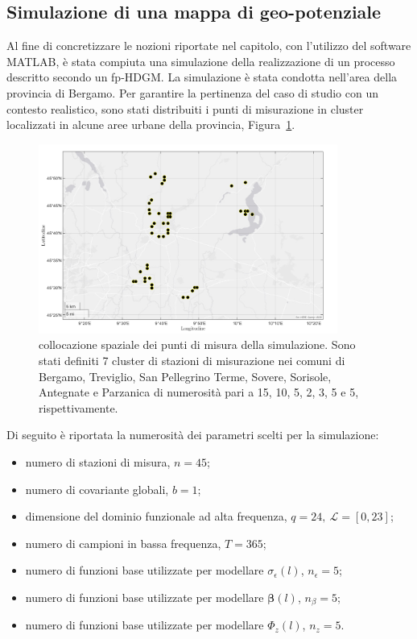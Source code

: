 \subsection[Simulazione di una mappa di geo-potenziale]{Simulazione di una mappa di geo-potenziale}
Al fine di concretizzare le nozioni riportate nel capitolo, con l'utilizzo del software MATLAB, è stata compiuta una simulazione della realizzazione di un processo descritto secondo un fp-HDGM. La simulazione è stata condotta nell'area della provincia di Bergamo. Per garantire la pertinenza del caso di studio con un contesto realistico, sono stati distribuiti i punti di misurazione in cluster localizzati in alcune aree urbane della provincia, Figura~\ref{mappa_stazioni_simulate}. 
\begin{figure}[htpb]
	\centering
	\includegraphics[height=235px]{Immagini/2. Nuovo modello/Mappa stazioni simulate_png}
	\caption[Collocazione spaziale dei punti di misura della simulazione.] {collocazione spaziale dei punti di misura della simulazione. Sono stati definiti 7 cluster di stazioni di misurazione nei comuni di Bergamo, Treviglio, San Pellegrino Terme, Sovere, Sorisole, Antegnate e Parzanica di numerosità pari a \num{15}, \num{10}, \num{5}, \num{2}, \num{3}, \num{5} e \num{5}, rispettivamente.}
	\label{mappa_stazioni_simulate}
\end{figure}
Di seguito è riportata la numerosità dei parametri scelti per la simulazione:
\begin{itemize}
	\item numero di stazioni di misura, $n=45$;
	\item numero di covariante globali, $b=1$;                               
	\item dimensione del dominio funzionale ad alta frequenza, $q=24,\ \mathcal{L}=[0, 23]$;
	\item numero di campioni in bassa frequenza, $T=365$;
	\item numero di funzioni base utilizzate per modellare  $\sigma_\epsilon (l)$,  $n_\epsilon =5$;
	\item numero di funzioni base utilizzate per modellare $\boldsymbol{\beta}(l)$, $n_\beta=5$;
	\item numero di funzioni base utilizzate per modellare $\Phi_z(l)$, $n_z=5$.
\end{itemize}
